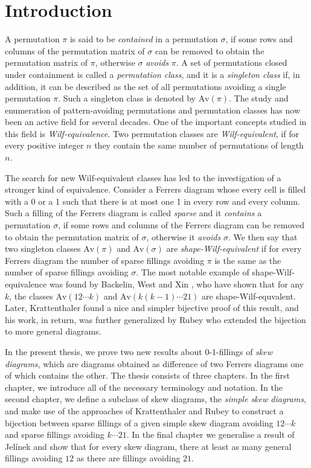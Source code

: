 \chapter*{Introduction}


A permutation $\pi$ is said to be \emph{contained} in a permutation $\sigma$,
if some rows and columns of the permutation matrix of $\sigma$ can be removed to obtain the permutation matrix of $\pi$,
otherwise $\sigma$ \emph{avoids} $\pi$. A set of permutations closed under containment is called a \emph{permutation class},
and it is a \emph{singleton class} if, in addition, it can be described as the set of all permutations avoiding a single permutation $\pi$.
Such a singleton class is denoted by $\text{Av}(\pi)$.
The study and enumeration of pattern-avoiding permutations and permutation classes has now been an active field for several decades.
One of the important concepts studied in this field is \emph{Wilf-equivalence}. Two permutation classes are \emph{Wilf-equivalent},
if for every positive integer $n$ they contain the same number of permutations of length $n$.

The search for new Wilf-equivalent classes has led to the investigation of a stronger kind of equivalence. Consider a Ferrers diagram
whose every cell is filled with a 0 or a 1 such that there is at most one 1 in every row and every column. Such a filling
of the Ferrers diagram is called \emph{sparse} and it \emph{contains}
a permutation $\sigma$, if some rows and columns of the Ferrers diagram can be removed to obtain the permutation matrix of $\sigma$,
otherwise it \emph{avoids} $\sigma$.
We then say that two singleton classes $\text{Av}(\pi)$ and $\text{Av}(\sigma)$ are \emph{shape-Wilf-equivalent} if for every
Ferrers diagram the number of sparse fillings avoiding $\pi$ is the same as the number of sparse fillings avoiding $\sigma$. 
The most notable example of shape-Wilf-equivalence was found by Backelin, West and Xin \cite{Backelin07}, who have
shown that for any $k$, the classes $\text{Av}(12\cdots k)$ and $\text{Av}(k(k-1)\cdots21)$ are shape-Wilf-equvalent.
Later, Krattenthaler \cite{Krattenthaler06} found a nice and simpler bijective proof of this result, and his work,
in return, was further generalized by Rubey \cite{Rubey11} who extended the bijection to more general diagrams.

In the present thesis, we prove two new results about 0-1-fillings of \emph{skew diagrams}, which are diagrams
obtained as difference of two Ferrers diagrams one of which contains the other. The thesis consists of three chapters.
In the first chapter, we introduce all of the necessary terminology and notation. In the second chapter,
we define a subclass of skew diagrams, the \emph{simple skew diagrams}, and 
make use of the approaches of Krattenthaler and Rubey to construct a bijection between sparse fillings
of a given simple skew diagram avoiding $12\cdots k$ and sparse fillings avoiding $k\cdots21$. In the final
chapter we generalise a result of Jelínek \cite{Jelinek08} and show that for every skew diagram,
there at least as many general fillings avoiding $12$ as there are fillings avoiding $21$.

